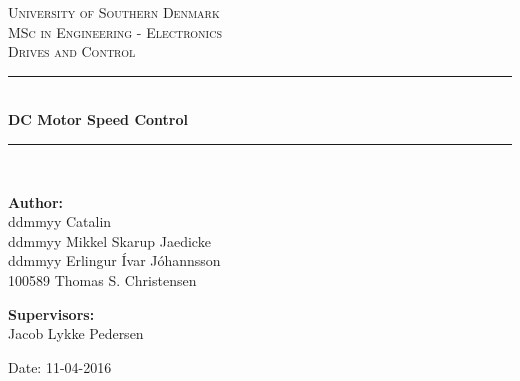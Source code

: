 \begin{titlepage}
\begin{center}

\textsc{\LARGE University of Southern Denmark}\\[1.5cm]
\textsc{\Large MSc in Engineering - Electronics}\\
\textsc{\large Drives and Control}\\[0.5cm]
\vfill
\hrule ~\\[0.3cm]
{ \huge \bfseries DC Motor Speed Control\\[0.4cm] }
\hrule ~\\[1.5cm]
\vfill

\begin{minipage}[t]{.49\textwidth}
\begin{flushleft} \large
\textbf{Author:}\\
ddmmyy Catalin\\
ddmmyy Mikkel Skarup Jaedicke\\
ddmmyy Erlingur Ívar Jóhannsson\\
100589 Thomas S. Christensen
\end{flushleft}
\end{minipage}
\begin{minipage}[t]{.49\textwidth}
\begin{flushright} \large
\textbf{Supervisors:} \\
Jacob Lykke Pedersen\\
\end{flushright}
\end{minipage}

\vspace{1.2cm}
Date: 11-04-2016

\end{center}
\end{titlepage}